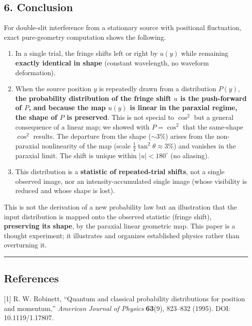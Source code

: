 \documentclass[
]{article}
\providecommand{\tightlist}{%
  \setlength{\itemsep}{0pt}\setlength{\parskip}{0pt}}
\begin{document}
\subsection{6. Conclusion}\label{conclusion}

For double-slit interference from a stationary source with positional
fluctuation, exact pure-geometry computation shows the following.

\begin{enumerate}
\def\labelenumi{\arabic{enumi}.}
\tightlist
\item
  In a single trial, the fringe shifts left or right by \(u(y)\) while
  remaining \textbf{exactly identical in shape} (constant wavelength, no
  waveform deformation).
\item
  When the source position \(y\) is repeatedly drawn from a distribution
  \(P(y)\), \textbf{the probability distribution of the fringe shift
  \(u\) is the push-forward of \(P\), and because the map \(u(y)\) is
  linear in the paraxial regime, the shape of \(P\) is preserved}. This
  is not special to \(\cos^2\) but a general consequence of a linear
  map; we showed with \(P=\cos^2\) that the same-shape \(\cos^2\)
  results. The departure from the shape (\(\sim3\%\)) arises from the
  non-paraxial nonlinearity of the map (scale
  \(\tfrac12\tan^2\theta\approx3\%\)) and vanishes in the paraxial
  limit. The shift is unique within \(|u|<180^\circ\) (no aliasing).
\item
  This distribution is a \textbf{statistic of repeated-trial shifts},
  not a single observed image, nor an intensity-accumulated single image
  (whose visibility is reduced and whose shape is lost).
\end{enumerate}

This is not the derivation of a new probability law but an illustration
that the input distribution is mapped onto the observed statistic
(fringe shift), \textbf{preserving its shape}, by the paraxial linear
geometric map. This paper is a thought experiment; it illustrates and
organizes established physics rather than overturning it.

\begin{center}\rule{0.5\linewidth}{0.5pt}\end{center}

\subsection{References}\label{references}

{[}1{]} R. W. Robinett, ``Quantum and classical probability
distributions for position and momentum,'' \emph{American Journal of
Physics} \textbf{63}(9), 823--832 (1995). DOI: 10.1119/1.17807.
\end{document}
